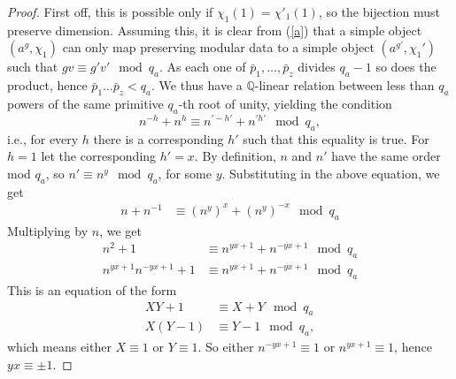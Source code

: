 \documentclass[11pt]{book}
\theoremstyle{Rem}
\theoremstyle{definition}
\numberwithin{equation}{section}
\newcommand\Q{\mathbb Q}
\newcommand{\pb}{\bar{p}}
\newcommand{\qb}{q_a}
\begin{document}
\begin{proof}
First off, this is possible only if $\chi_1(1) = \chi'_1(1)$, so the bijection must preserve dimension.	 Assuming this,  it is clear from (\ref{a}) that a simple object $(a^g, \chi_1)$ can only map preserving modular data to a simple object $(a^{g'}, \chi_1')$ such that $gv \equiv g'v'\mod \qb$. As each one of $\pb_1,\dots,\pb_z$ divides $q_a-1$ so does the product, hence $\pb_1\dots \pb_z < q_a$. We thus have a  $\Q$-linear relation between less than $\qb$ powers of the same primitive $\qb$-th root of unity, yielding the condition
\begin{equation}
	n^{-h} +n^h \equiv n^{\prime-h'} +n^{\prime h'} \mod \qb,
\end{equation} i.e., for every $h$ there is a corresponding $h'$ such that this equality is true. For $h=1$ let the corresponding $h'=x$.
	By definition,  $n$ and $n'$ have the same order mod $\qb$, so $n' \equiv n^y \mod \qb$, for some $y$. Substituting in the above equation, we get
	\begin{align} 
	n +n^{-1} &\equiv (n^y)^x +(n^y)^{-x} \mod \qb
	\end{align}
	Multiplying by $n$, we get 
	\begin{align}
		n^2 +1 &\equiv n^{yx+1} +n^{-yx+1} \mod \qb\\
		n^{yx+1}n^{-yx+1} +1 &\equiv n^{yx+1} +n^{-yx+1} \mod \qb
	\end{align}
	This is an equation of the form 
	\begin{align}
		XY + 1 &\equiv X + Y\mod \qb \\
		X(Y-1) &\equiv Y-1 \mod \qb,
	\end{align}
which means either $X\equiv1$ or $Y\equiv1$. So either $n^{-yx+1}\equiv1$ or $n^{yx+1}\equiv1$, hence $yx \equiv \pm 1$.
\end{proof}
\end{document}
